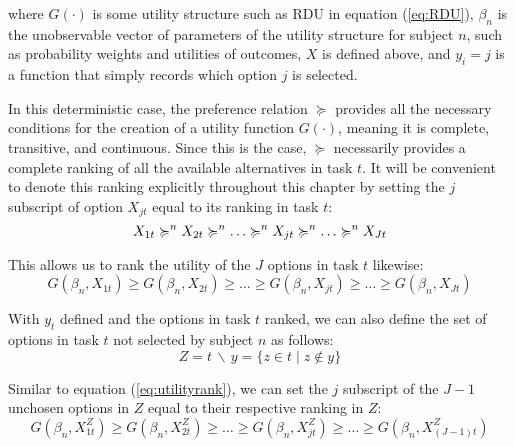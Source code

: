 \documentclass[11pt,a4paper]{article}
\begin{document}
\noindent where $G(\cdot)$ is some utility structure such as RDU in equation (\ref{eq:RDU}), $\beta_n$ is the unobservable vector of parameters of the utility structure for subject $n$, such as probability weights and utilities of outcomes, $X$ is defined above, and $y_i=j$ is a function that simply records which option $j$ is selected.

In this deterministic case, the preference relation $\succcurlyeq$ provides all the necessary conditions for the creation of a utility function $G(\cdot)$, meaning it is complete, transitive, and continuous.
Since this is the case, $\succcurlyeq$ necessarily provides a complete ranking of all the available alternatives in task $t$.
It will be convenient to denote this ranking explicitly throughout this chapter by setting the $j$ subscript of option $X_{jt}$ equal to its ranking in task $t$:
\begin{equation}
	\label{eq:outcomerank} 
	X_{1t} \succcurlyeq^n X_{2t} \succcurlyeq^n \ldots \succcurlyeq^n X_{jt} \succcurlyeq^n \ldots \succcurlyeq^n X_{Jt}\\
\end{equation}

\noindent This allows us to rank the utility of the $J$ options in task $t$ likewise:
\begin{equation}
	\label{eq:utilityrank}
	G(\beta_n,X_{1t}) \geq G(\beta_n,X_{2t}) \geq \ldots \geq G(\beta_n,X_{jt}) \geq \ldots \geq G(\beta_n,X_{Jt})
\end{equation}

With $y_t$ defined and the options in task $t$ ranked, we can also define the set of options in task $t$ not selected by subject $n$ as follows:
\begin{equation}
	\label{eq:emptyset}
	Z = t \,\backslash\, y = \{z \in t \;|\; z \notin y \}
\end{equation}

Similar to equation (\ref{eq:utilityrank}), we can set the $j$ subscript of the $J-1$ unchosen options in $Z$ equal to their respective ranking in $Z$:
\begin{equation}
	\label{eq:Zutilityrank}
	G(\beta_n,X_{1t}^Z) \geq G(\beta_n,X_{2t}^Z) \geq \ldots \geq G(\beta_n,X_{jt}^Z) \geq \ldots \geq G(\beta_n,X_{(J-1)t}^Z)
\end{equation}
 
\end{document}
